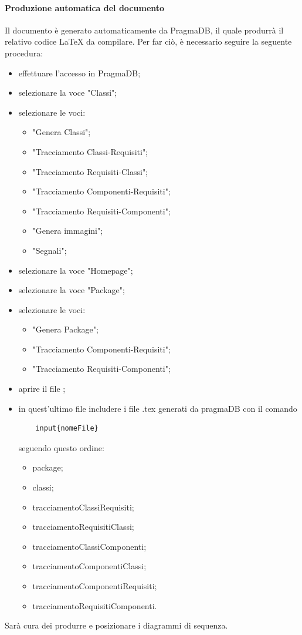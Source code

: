  \paragraph{Produzione automatica del documento \DPdoc}
 Il documento \DPdoc{} è generato automaticamente da PragmaDB, il quale produrrà il relativo codice \LaTeX{} da compilare.
 Per far ciò, è necessario seguire la seguente procedura:
 \begin{itemize}
 	\item effettuare l'accesso in PragmaDB;
 	\item selezionare la voce "Classi";
 	\item selezionare le voci:
 	\begin{itemize}
 		\item "Genera Classi";
 		\item "Tracciamento Classi-Requisiti";
 		\item "Tracciamento Requisiti-Classi";
 		\item "Tracciamento Componenti-Requisiti";
 		\item "Tracciamento Requisiti-Componenti";
 		\item "Genera immagini";
 		\item "Segnali";
 	\end{itemize}
 	\item selezionare la voce "Homepage";
 	\item selezionare la voce "Package";
 	\item selezionare le voci:
 	\begin{itemize}
 		\item "Genera Package";
 		\item "Tracciamento Componenti-Requisiti";
 		\item "Tracciamento Requisiti-Componenti";
 	\end{itemize}
 	\item aprire il file \DPfile;
 	\item in quest'ultimo file includere i file .tex generati da pragmaDB con il comando \begin{lstlisting}
 	input{nomeFile}
 	\end{lstlisting}
 	seguendo questo ordine:
 	\begin{itemize}
 		\item package;
 		\item classi;
 		\item tracciamentoClassiRequisiti;
 		\item tracciamentoRequisitiClassi;
 		\item tracciamentoClassiComponenti;
 		\item tracciamentoComponentiClassi;
 		\item tracciamentoComponentiRequisiti;
 		\item tracciamentoRequisitiComponenti.
 	\end{itemize}
 \end{itemize}
 Sarà cura dei \PJP{} produrre e posizionare i diagrammi di sequenza.
